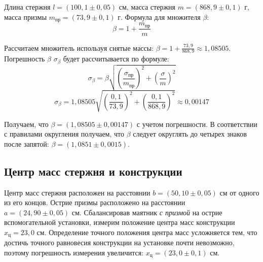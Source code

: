 \documentclass[a4paper,12pt]{article}
\begin{document}
 	Длина стержня $l = \left(  100,1 \pm 0,05\right)$ см, масса стержня $m =\left(  868,9 \pm 0,1\right)$ г, масса призмы $m_\text{пр}=\left( 73,9 \pm 0,1\right)$ г. Формула для множителя $\beta$:
 	\begin{equation}
 		\beta=1+\frac{m_\text{пр}}{m}
 	\end{equation}
 	
 	\noindent Рассчитаем множитель используя снятые массы: $\beta = 1+\frac{73,9}{868,9}\approx1,08505$. Погрешность $\beta$ $\sigma_\text{$\beta$}$ будет рассчитывается по формуле:
 	\begin{equation}
 		\sigma_\text{$\beta$}=\beta\sqrt{\left(\frac{\sigma_\text{пр}}{m_\text{пр}}\right)^2+\left(\frac{\sigma}{m}\right)^2}
 	\end{equation}
 	\begin{equation}
 		\sigma_\text{$\beta$}=1,08505\sqrt{\left(\frac{0,1}{73,9}\right)^2+\left(\frac{0,1}{868,9}\right)^2}\approx0,00147
 	\end{equation}
 	\par Получаем, что $\beta = \left( 1,08505 \pm 0,00147\right)$ с учетом погрешности. В соответствии с правилами округления получаем, что $\beta$ следует округлять до четырех знаков после запятой: $\beta = \left( 1,0851 \pm 0,0015\right)$.
 	
 	\subsection{Центр масс стержня и конструкции}
 	Центр масс стержня расположен на расстоянии $b = (50, 10 \pm 0,05) \text{ см}$ от одного из его концов. Острие призмы расположено на расстоянии $a = (24,90 \pm 0,05) \text{ см}$. 
 	Сбалансировав маятник \emph{с призмой} на острие вспомогательной установки, измерим положение центра масс конструкции $x_\text{ц} = 23,0\text{ см}$. Определение точного положения центра масс усложняется тем, что достичь точного равновесия конструкции на установке почти невозможно, поэтому погрешность измерения увеличится: $x_\text{ц} = (23,0 \pm 0,1)\text{ см}$.
 	
\end{document}
